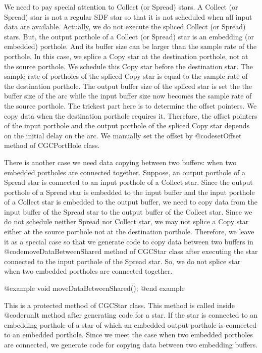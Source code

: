 {We need to pay special attention to Collect (or Spread) stars. A Collect
(or Spread) star is not a regular SDF star so that it is not 
scheduled when all input data are available. Actually, we do not execute 
the spliced Collect (or Spread) stars.
But, the output porthole of a Collect (or Spread) star is an embedding
(or embedded) porthole. And
its buffer size can be larger than the sample rate of the porthole.
In this case, we splice a Copy star at the destination porthole, not
at the source porthole. We schedule this Copy star before the destination
star. The sample rate of portholes of the spliced Copy star is equal to
the sample rate of the destination porthole. The output buffer size
of the spliced star is set the the buffer size of the arc while the input
buffer size now becomes the sample rate of the source porthole. The
trickest part here is to determine the offset pointers. We copy data 
when the destination porthole requires it. Therefore, the offset pointers of
the input porthole and the output porthole of the spliced Copy star
depends on the initial delay on the arc. We manually set the offset by
@code{setOffset} method of CGCPortHole class.

There is another case we need data copying between two buffers: when
two embedded portholes are connected together. Suppose, an output porthole
of a Spread star is connected to an input porthole of a Collect star.
Since the output porthole of a Spread star is embedded to the input buffer
and the input porthole of a Collect star is embedded to the output buffer,
we need to copy data from the input buffer of the Spread star to the output
buffer of the Collect star. Since we do not schedule neither Spread nor
Collect star, we may not splice a Copy star either at the source porthole
not at the destination porthole. Therefore, we leave it as a special case
so that we generate code to copy data between two buffers in
@code{moveDataBetweenShared} method of CGCStar class after executing the
star connected to the input porthole of the Spread star. So, we do not
splice star when two embedded portholes are connected together.

@example
void moveDataBetweenShared();
@end example

This is a protected method of CGCStar class. This method is called inside
@code{runIt} method after generating code for a star. If the star is
connected to an embedding porthole of a star of which an embedded output 
porthole is connected to an embedded porthole. Since we meet the case
when two embedded portholes are connected, we generate code for copying
data between two embedding buffers.

}
